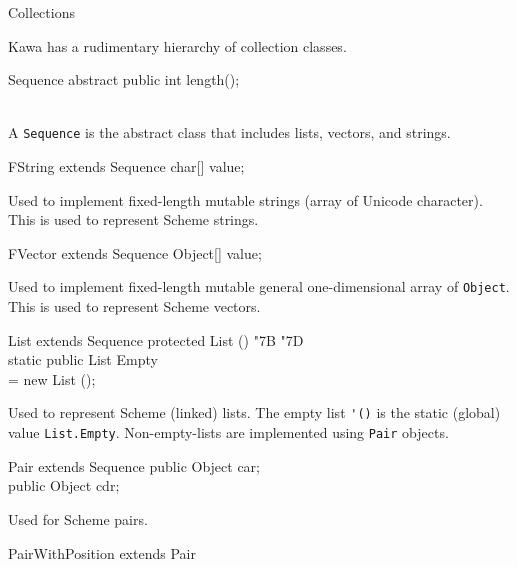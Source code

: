 \documentclass[twocolumn]{article}
\makeatletter
\def\section{\@startsection {section}{1}{\z@}
   {14pt plus 2pt minus 2pt}{12pt plus 2pt minus 2pt} {\large\bf}}
\newcommand{\LBr}{\char"7B}
\newcommand{\RBr}{\char"7D}
\newcommand{\Tab}{\>}
\makeatother
\begin{document}
\section{Collections}

Kawa has a rudimentary hierarchy of collection classes.

\begin{Class}{Sequence}{}
abstract public int length();\\
\\
\end{Class}

A {\tt Sequence} is the abstract class that includes
lists, vectors, and strings.

\begin{Class}{FString}{ extends Sequence}
char[] value;\\
\end{Class}

Used to implement fixed-length mutable strings (array of Unicode character).
This is used to represent Scheme strings.

\begin{Class}{FVector}{ extends Sequence}
Object[] value;\\
\end{Class}
Used to implement fixed-length mutable general one-dimensional array
of {\tt Object}.
This is used to represent Scheme vectors.

\begin{Class}{List}{ extends Sequence}
protected List () {\LBr} \RBr\\
static public List Empty\\
\Tab = new List ();\\
\end{Class}

Used to represent Scheme (linked) lists.
The empty list \verb|'()| is the static (global)
value {\tt List.Empty}.  Non-empty-lists are implemented using {\tt Pair}
objects.

\begin{Class}{Pair}{ extends Sequence}
public Object car;\\
public Object cdr;\\
\end{Class}

Used for Scheme pairs.

\begin{Class}{PairWithPosition}{ extends Pair}
\end{Class}
\end{document}
